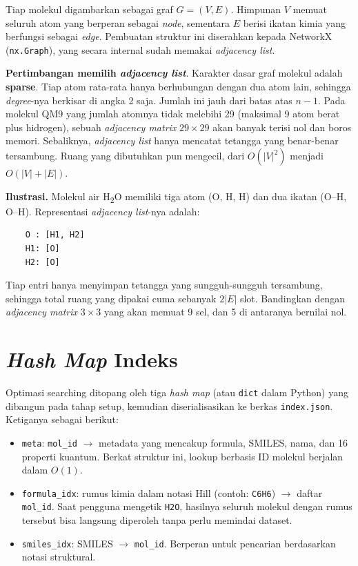 \documentclass[a4paper,12pt]{report}
\begin{document}
Tiap molekul digambarkan sebagai graf $G = (V, E)$. Himpunan $V$ memuat seluruh atom yang berperan sebagai \textit{node}, sementara $E$ berisi ikatan kimia yang berfungsi sebagai \textit{edge}. Pembuatan struktur ini diserahkan kepada NetworkX (\texttt{nx.Graph}), yang secara internal sudah memakai \textit{adjacency list}.

\textbf{Pertimbangan memilih \textit{adjacency list}}. Karakter dasar graf molekul adalah \textbf{sparse}. Tiap atom rata-rata hanya berhubungan dengan dua atom lain, sehingga \textit{degree}-nya berkisar di angka 2 saja. Jumlah ini jauh dari batas atas $n - 1$. Pada molekul QM9 yang jumlah atomnya tidak melebihi 29 (maksimal 9 atom berat plus hidrogen), sebuah \textit{adjacency matrix} $29 \times 29$ akan banyak terisi nol dan boros memori. Sebaliknya, \textit{adjacency list} hanya mencatat tetangga yang benar-benar tersambung. Ruang yang dibutuhkan pun mengecil, dari $O(|V|^2)$ menjadi $O(|V| + |E|)$.

\textbf{Ilustrasi.} Molekul air H\textsubscript{2}O memiliki tiga atom (O, H, H) dan dua ikatan (O--H, O--H). Representasi \textit{adjacency list}-nya adalah:

\begin{verbatim}
    O : [H1, H2]
    H1: [O]
    H2: [O]
\end{verbatim}

Tiap entri hanya menyimpan tetangga yang sungguh-sungguh tersambung, sehingga total ruang yang dipakai cuma sebanyak $2|E|$ slot. Bandingkan dengan \textit{adjacency matrix} $3 \times 3$ yang akan memuat 9 sel, dan 5 di antaranya bernilai nol.

\section{\textit{Hash Map} Indeks}

Optimasi searching ditopang oleh tiga \textit{hash map} (atau \texttt{dict} dalam Python) yang dibangun pada tahap setup, kemudian diserialisasikan ke berkas \texttt{index.json}. Ketiganya sebagai berikut:

\begin{itemize}
    \item \texttt{meta}: \texttt{mol\_id} $\to$ metadata yang mencakup formula, SMILES, nama, dan 16 properti kuantum. Berkat struktur ini, lookup berbasis ID molekul berjalan dalam $O(1)$.
    \item \texttt{formula\_idx}: rumus kimia dalam notasi Hill (contoh: \texttt{C6H6}) $\to$ daftar \texttt{mol\_id}. Saat pengguna mengetik \texttt{H2O}, hasilnya seluruh molekul dengan rumus tersebut bisa langsung diperoleh tanpa perlu memindai dataset.
    \item \texttt{smiles\_idx}: SMILES $\to$ \texttt{mol\_id}. Berperan untuk pencarian berdasarkan notasi struktural.
\end{itemize}
\end{document}
